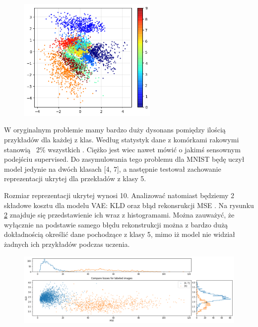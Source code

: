 \begin{figure}[h!]
    \centering
    \includegraphics[width=0.6\textwidth]{images/mnist_2d}
    \caption{}
    \label{fig:mnist_2d}
\end{figure}

W oryginalnym problemie mamy bardzo duży dysonans pomiędzy ilością przykładów dla każdej z klas. Według statystyk dane z komórkami rakowymi stanowią ~2\% wszystkich . Ciężko jest wiec nawet mówić o jakimś sensownym podejściu supervised. Do zasymulowania tego problemu dla MNIST będę uczył model jedynie na dwóch klasach [4, 7], a następnie testował zachowanie reprezentacji ukrytej dla przekładów z klasy 5.

Rozmiar reprezentacji ukrytej wynosi 10. Analizować natomiast będziemy 2 składowe kosztu dla modelu VAE: KLD oraz błąd rekonsrukcji MSE . Na rysunku \ref{fig:mnist_compare} znajduje się przedstawienie ich wraz z histogramami. Można zauważyć, że wyłącznie na podstawie samego błędu rekonstrukcji można z bardzo dużą dokładnością określić dane pochodzące z klasy 5, mimo iż model nie widział żadnych ich przykładów podczas uczenia.

\begin{figure}[h!]
    \centering
    \includegraphics[width=1.0\textwidth]{images/mnist_compare}
    \caption{}
    \label{fig:mnist_compare}
\end{figure}

